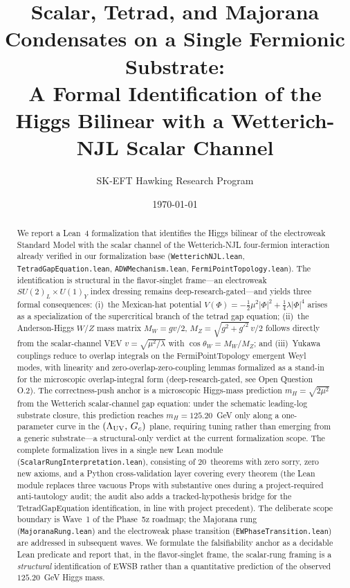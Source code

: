 \documentclass[aps,prd,twocolumn,showpacs,superscriptaddress,nofootinbib]{revtex4-2}
\newcommand{\HiggsField}{\Phi}
\begin{document}
\title{Scalar, Tetrad, and Majorana Condensates on a Single Fermionic
Substrate:\\
A Formal Identification of the Higgs Bilinear with a Wetterich-NJL
Scalar Channel}

\author{SK-EFT Hawking Research Program}

\date{\today}

\begin{abstract}
We report a Lean~4 formalization that identifies the Higgs bilinear
of the electroweak Standard Model with the scalar channel of the
Wetterich-NJL four-fermion interaction already verified in our
formalization base (\texttt{WetterichNJL.lean}, \texttt{TetradGapEquation.lean},
\texttt{ADWMechanism.lean}, \texttt{FermiPointTopology.lean}). The
identification is structural in the flavor-singlet frame---an electroweak
$SU(2)_L\times U(1)_Y$ index dressing remains deep-research-gated---and
yields three formal consequences: (i)~the Mexican-hat potential
$V(\HiggsField) = -\tfrac{1}{2}\mu^2|\HiggsField|^2 +
\tfrac{1}{4}\lambda|\HiggsField|^4$ arises as a specialization of the
supercritical branch of the tetrad gap equation; (ii)~the Anderson-Higgs
$W$/$Z$ mass matrix $M_W = gv/2$, $M_Z = \sqrt{g^2+g'^2}\,v/2$ follows
directly from the scalar-channel VEV $v = \sqrt{\mu^2/\lambda}$ with
$\cos\theta_W = M_W/M_Z$; and (iii)~Yukawa couplings reduce to overlap
integrals on the FermiPointTopology emergent Weyl modes, with linearity
and zero-overlap-zero-coupling lemmas formalized as a stand-in for the
microscopic overlap-integral form (deep-research-gated, see Open Question
O.2). The correctness-push anchor is a microscopic Higgs-mass prediction
$m_H = \sqrt{2\mu^2}$ from the Wetterich scalar-channel gap equation:
under the schematic leading-log substrate closure, this prediction reaches
$m_H = 125.20$~GeV only along a one-parameter curve in the
$(\Lambda_{\rm UV},\,G_c)$ plane, requiring tuning rather than emerging
from a generic substrate---a structural-only verdict at the current
formalization scope. The complete formalization lives in a single new
Lean module (\texttt{ScalarRungInterpretation.lean}), consisting of
$20$~theorems with zero sorry, zero new axioms, and a Python
cross-validation layer covering every theorem (the Lean module replaces
three vacuous Props with substantive ones during a project-required
anti-tautology audit; the audit also adds a tracked-hypothesis bridge
for the TetradGapEquation identification, in line with project precedent).
The deliberate scope boundary is Wave~1 of the Phase~5z roadmap;
the Majorana rung (\texttt{MajoranaRung.lean}) and the electroweak phase
transition (\texttt{EWPhaseTransition.lean}) are addressed in subsequent
waves. We formulate the falsifiability anchor as a decidable Lean
predicate and report that, in the flavor-singlet frame, the scalar-rung
framing is a \emph{structural} identification of EWSB rather than a
quantitative prediction of the observed $125.20$~GeV Higgs mass.
\end{abstract}
\end{document}
